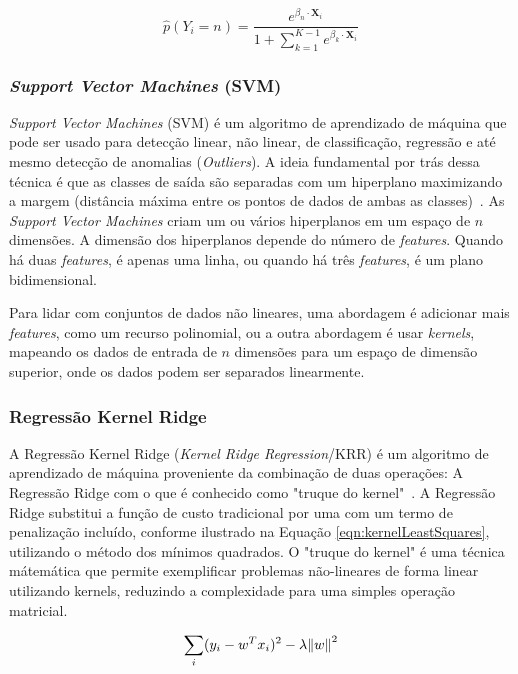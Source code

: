 \documentclass[Portugues,Final]{ic-tese-v3}
\begin{document}
\begin{equation}
\hat{p}(Y_i = n) = \frac{e^{\beta_{n} \cdot \textbf{X}_{i}}}{1 + \sum^{K-1}_{k=1} e^{\beta_{k} \cdot \textbf{X}_{i}}}
\end{equation}

\subsubsection{\textit{Support Vector Machines} (SVM)}

\textit{Support Vector Machines} (SVM) é um algoritmo de aprendizado de máquina que pode ser usado para detecção linear, não linear, de classificação, regressão e até mesmo detecção de anomalias (\textit{Outliers}). A ideia fundamental por trás dessa técnica é que as classes de saída são separadas com um hiperplano maximizando a margem (distância máxima entre os pontos de dados de ambas as classes)~\cite{Steinwart_2008}. As \textit{Support Vector Machines} criam um ou vários hiperplanos em um espaço de $n$ dimensões. A dimensão dos hiperplanos depende do número de \textit{features}. Quando há duas \textit{features}, é apenas uma linha, ou quando há três \textit{features}, é um plano bidimensional.

Para lidar com conjuntos de dados não lineares, uma abordagem é adicionar mais \textit{features}, como um recurso polinomial, ou a outra abordagem é usar \textit{kernels}, mapeando os dados de entrada de $n$ dimensões para um espaço de dimensão superior, onde os dados podem ser separados linearmente.

\subsubsection{Regressão Kernel Ridge}

A Regressão Kernel Ridge (\textit{Kernel Ridge Regression}/KRR) é um algoritmo de aprendizado de máquina proveniente da combinação de duas operações: A Regressão Ridge com o que é conhecido como "truque do kernel"~\cite{Witten_2016}. A Regressão Ridge substitui a função de custo tradicional por uma com um termo de penalização incluído, conforme ilustrado na Equação \ref{eqn:kernelLeastSquares}, utilizando o método dos mínimos quadrados. O "truque do kernel" é uma técnica mátemática que permite exemplificar problemas não-lineares de forma linear utilizando kernels, reduzindo a complexidade para uma simples operação matricial.

\begin{equation}
\label{eqn:kernelLeastSquares}
\sum_{i} (y_{i} - w^{T}x_i)^{2} - \lambda \norm{w}^{2}
\end{equation}
\end{document}
